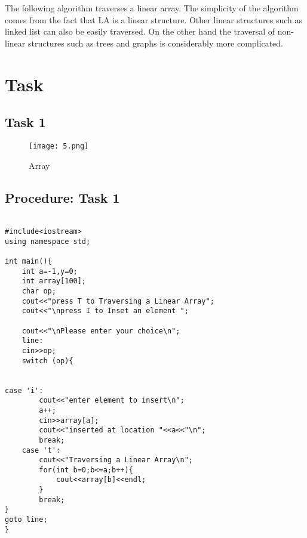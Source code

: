 \documentclass[11pt]{article}            %
\begin{document}
The following algorithm traverses a linear array. The simplicity of the algorithm comes from the fact that LA is a linear structure. Other linear structures such as linked list can also be easily traversed. On the other hand the traversal of non-linear structures such as trees and graphs is considerably more complicated.


\section{Task}  
\subsection{ Task 1 }     

\begin{figure*}
\centering
  \texttt{[image: 5.png]}
\caption{Array}
\label{Figure:3}    
\end{figure*}

\subsection{Procedure: Task 1 }     

\begin{lstlisting}

#include<iostream>
using namespace std;

int main(){
	int a=-1,y=0;
	int array[100];
	char op;
	cout<<"press T to Traversing a Linear Array";
	cout<<"\npress I to Inset an element ";

	cout<<"\nPlease enter your choice\n";
	line:
	cin>>op;
	switch (op){
	

case 'i':
		cout<<"enter element to insert\n";
		a++;
		cin>>array[a];
		cout<<"inserted at location "<<a<<"\n";
		break;
	case 't':
		cout<<"Traversing a Linear Array\n";
		for(int b=0;b<=a;b++){
			cout<<array[b]<<endl;
		}
		break;
}
goto line;
}

\end{lstlisting}

 
\end{document}
